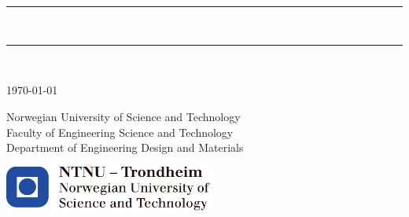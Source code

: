 \begin{titlepage}

\begin{center}
    
     
    ~\\[3.5cm]
    
    \LARGE \textbf{\myauthor}\\[1.5cm]
    
    \hrule ~\\[0.2cm]
    {\fontsize{60pt}{20pt}\selectfont\mytitle}	%
    \vspace{0.5cm}
    \hrule ~\\[0.2cm]
    
    
    \vspace{1.5cm}
\end{center}




\vfill


{\large \today}
\vspace{1.5cm} 

\large{Norwegian University of Science and Technology
\\[0.2cm]
Faculty of Engineering Science and Technology\\[0.2cm]
Department of Engineering Design and Materials} 
\vspace{1.5cm} 


\includegraphics[height=1.5cm]{images/ntnu_logo.pdf} 

\end{titlepage}